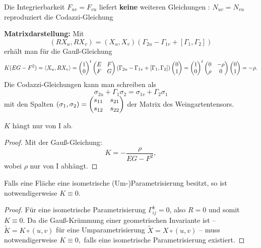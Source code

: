 \begin{remark}
	
	Die Integrierbarkeit $ F_{uv} = F_{vu} $ liefert \textbf{keine} weiteren Gleichungen : $ N_{uv}=N_{vu} $ reproduziert die Codazzi-Gleichung
	
\end{remark}

\textbf{Matrixdarstellung:} Mit 
		\[ (RX_u,RX_v)= (X_u,X_v)(\Gamma_{2u}-\Gamma_{1v} + [\Gamma_{1},\Gamma_{2}]) \] 
	erhält man für die Gauß-Gleichung 
		\[ K(EG-F^2) = \left \langle X_u,RX_v \right\rangle = \begin{pmatrix} 1 \\ 0 \end{pmatrix}^t\begin{pmatrix} E & F \\ F & G \end{pmatrix} ( \Gamma_{2u}-\Gamma_{1v} + [\Gamma_{1},\Gamma_{2}]) \begin{pmatrix} 0 \\ 1 \end{pmatrix} = \begin{pmatrix} 1 \\ 0 \end{pmatrix}^t \begin{pmatrix}  0 &- \rho \\ \rho & 0 \end{pmatrix} \begin{pmatrix} 0 \\ 1 \end{pmatrix} = -\rho. \] 
	Die Codazzi-Gleichungen kann man schreiben als 
		\[ \sigma_{2u}+\Gamma_{1}\sigma_{2} = \sigma_{1v}+\Gamma_{2}\sigma_{1} \]
	mit den Spalten $ (\sigma_{1},\sigma_{2}) = \begin{pmatrix} s_{11} & s_{21} \\ s_{12} & s_{22}  \end{pmatrix} $ der Matrix des Weingartentensors.
	
\begin{theorem}
	$K$ hängt nur von $ \mathrm{I} $ ab.
\end{theorem}

\begin{proof}
	
	Mit der Gauß-Gleichung:
		\[K = -\dfrac{\rho}{EG-F^2}, \]
	wobei $ \rho $ nur von $ \mathrm{I} $ abhängt.
	
\end{proof}

\begin{corollary}
	Falls eine Fläche eine isometrische (Um-)Parametrisierung besitzt, so ist notwendigerweise $ K \equiv 0 $.
\end{corollary}

\begin{proof}
	
	Für eine isometrische Parametrisierung $ \Gamma_{ij}^k = 0 $, also $ R = 0 $ und somit $ K \equiv 0. $
	Da die Gauß-Krümmung einer geometrischen Invariante ist -- $ \widetilde{K} = K \circ (u,v) $ für eine Umparametrisierung $ \widetilde{X}=X \circ(u,v) $ -- muss notwendigerweise $ K \equiv 0, $ falls eine isometrische Parametrisierung existiert.	
\end{proof}

